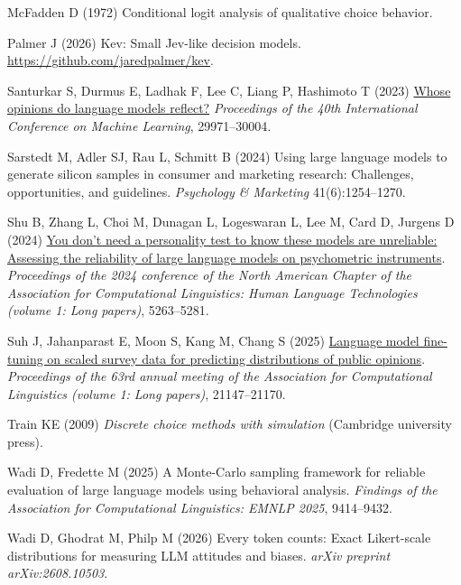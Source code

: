 \documentclass[
  11pt,
  letterpaper,
]{article}
\newlength{\cslhangindent}
\newenvironment{CSLReferences}[2] %
 {\begin{list}{}{%
  \setlength{\itemindent}{0pt}
  \setlength{\leftmargin}{0pt}
  \setlength{\parsep}{0pt}
  \ifodd #1
   \setlength{\leftmargin}{\cslhangindent}
   \setlength{\itemindent}{-1\cslhangindent}
  \fi
  \setlength{\itemsep}{#2\baselineskip}}}
 {\end{list}}
\begin{document}
\begin{CSLReferences}{1}{0}
McFadden D (1972) Conditional logit analysis of qualitative choice
behavior.

Palmer J (2026) Kev: Small {Jev}-like decision models.
\url{https://github.com/jaredpalmer/kev}.

Santurkar S, Durmus E, Ladhak F, Lee C, Liang P, Hashimoto T (2023)
\href{https://proceedings.mlr.press/v202/santurkar23a.html}{Whose
opinions do language models reflect?} \emph{Proceedings of the 40th
{International Conference on Machine Learning}}, 29971--30004.

Sarstedt M, Adler SJ, Rau L, Schmitt B (2024) Using large language
models to generate silicon samples in consumer and marketing research:
Challenges, opportunities, and guidelines. \emph{Psychology \&
Marketing} 41(6):1254--1270.

Shu B, Zhang L, Choi M, Dunagan L, Logeswaran L, Lee M, Card D, Jurgens
D (2024) \href{https://doi.org/10.18653/v1/2024.naacl-long.295}{You
don{'}t need a personality test to know these models are unreliable:
Assessing the reliability of large language models on psychometric
instruments}. \emph{Proceedings of the 2024 conference of the {North
American Chapter of the Association for Computational Linguistics}:
{Human Language Technologies} (volume 1: Long papers)}, 5263--5281.

Suh J, Jahanparast E, Moon S, Kang M, Chang S (2025)
\href{https://doi.org/10.18653/v1/2025.acl-long.1028}{Language model
fine-tuning on scaled survey data for predicting distributions of public
opinions}. \emph{Proceedings of the 63rd annual meeting of the
{A}ssociation for {C}omputational {L}inguistics (volume 1: Long
papers)}, 21147--21170.

Train KE (2009) \emph{Discrete choice methods with simulation}
(Cambridge university press).

Wadi D, Fredette M (2025) A {Monte-Carlo} sampling framework for
reliable evaluation of large language models using behavioral analysis.
\emph{Findings of the {Association for Computational Linguistics}:
{EMNLP} 2025}, 9414--9432.

Wadi D, Ghodrat M, Philp M (2026) Every token counts: Exact
{Likert}-scale distributions for measuring LLM attitudes and biases.
\emph{arXiv preprint arXiv:2608.10503}.


\end{CSLReferences}
\end{document}
